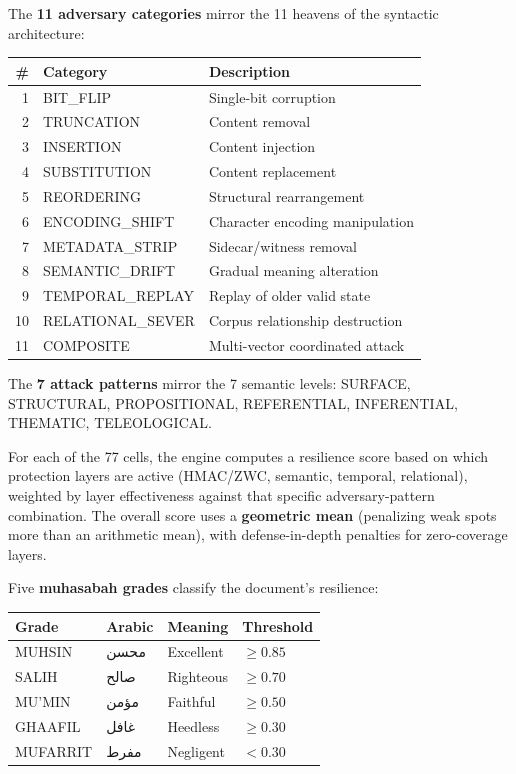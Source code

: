 \documentclass[11pt,a4paper]{article}
\begin{document}
The \textbf{11 adversary categories} mirror the 11 heavens of the syntactic architecture:
\begin{center}
\small
\begin{tabular}{rll}
\toprule
\textbf{\#} & \textbf{Category} & \textbf{Description} \\
\midrule
1 & BIT\_FLIP & Single-bit corruption \\
2 & TRUNCATION & Content removal \\
3 & INSERTION & Content injection \\
4 & SUBSTITUTION & Content replacement \\
5 & REORDERING & Structural rearrangement \\
6 & ENCODING\_SHIFT & Character encoding manipulation \\
7 & METADATA\_STRIP & Sidecar/witness removal \\
8 & SEMANTIC\_DRIFT & Gradual meaning alteration \\
9 & TEMPORAL\_REPLAY & Replay of older valid state \\
10 & RELATIONAL\_SEVER & Corpus relationship destruction \\
11 & COMPOSITE & Multi-vector coordinated attack \\
\bottomrule
\end{tabular}
\end{center}

The \textbf{7 attack patterns} mirror the 7 semantic levels: SURFACE, STRUCTURAL, PROPOSITIONAL, REFERENTIAL, INFERENTIAL, THEMATIC, TELEOLOGICAL.

For each of the 77 cells, the engine computes a resilience score based on which protection layers are active (HMAC/ZWC, semantic, temporal, relational), weighted by layer effectiveness against that specific adversary-pattern combination. The overall score uses a \textbf{geometric mean} (penalizing weak spots more than an arithmetic mean), with defense-in-depth penalties for zero-coverage layers.

Five \textbf{muhasabah grades} classify the document's resilience:

\begin{center}
\begin{tabular}{llll}
\toprule
\textbf{Grade} & \textbf{Arabic} & \textbf{Meaning} & \textbf{Threshold} \\
\midrule
MUHSIN & محسن & Excellent & $\geq 0.85$ \\
SALIH & صالح & Righteous & $\geq 0.70$ \\
MU'MIN & مؤمن & Faithful & $\geq 0.50$ \\
GHAAFIL & غافل & Heedless & $\geq 0.30$ \\
MUFARRIT & مفرط & Negligent & $< 0.30$ \\
\bottomrule
\end{tabular}
\end{center}
\end{document}
